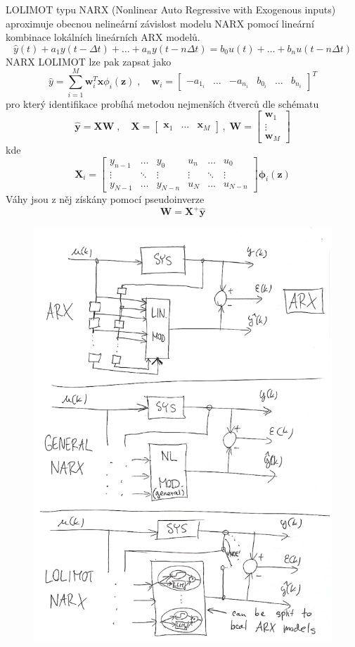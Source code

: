 \documentclass{article}
\begin{document}
	LOLIMOT typu NARX (Nonlinear Auto Regressive with Exogenous inputs) aproximuje obecnou nelineární závislost modelu NARX pomocí lineární kombinace lokálních lineárních ARX modelů.
	\begin{equation}
		\hat{y}(t) + a_1 y(t-\Delta t) + \dots + a_n y(t-n\Delta t)
		=
		b_0 u(t) + \dots + b_n u(t-n\Delta t)
	\end{equation}
	NARX LOLIMOT lze pak zapsat jako
	\begin{equation}
		\hat{y} = \sum_{i=1}^M \bm{w}_i^T \bm{x} \phi_i(\bm{z})
		\;,\quad 
		\bm{w}_i = \begin{bmatrix} -a_{1_i} & \dots & -a_{n_i} & b_{0_i} & \dots & b_{n_i} \end{bmatrix}^T
	\end{equation}
	pro který identifikace probíhá metodou nejmenších čtverců dle schématu
	\begin{equation}
		\bm{\hat{y}} = \bm{X}\bm{W}
		\;,\quad 
		\bm{X}
		=
		\begin{bmatrix}
			\bm{x}_1 & \dots & \bm{x}_M
		\end{bmatrix}
		\,,\;
		\bm{W}
		=
		\begin{bmatrix}
		\bm{w}_1 \\ \vdots \\ \bm{w}_M
		\end{bmatrix}
	\end{equation}
	kde
	\begin{equation}
		\bm{X}_i
		=
		\begin{bmatrix}
			y_{n-1} & \dots & y_0 & u_n & \dots & u_0 \\
			\vdots & \ddots & \vdots & \vdots & \ddots & \vdots \\
			y_{N-1} & \dots & y_{N-n} & u_N & \dots & u_{N-n}
		\end{bmatrix}
		\bm{\phi}_i(\bm{z})
	\end{equation}
	Váhy jsou z něj získány pomocí pseudoinverze
	\begin{equation}
	\bm{W} = \bm{X}^+ \bm{\hat{y}}
	\end{equation}

	\begin{figure}[h!]
		\centering
		\includegraphics[width=.5\linewidth]{figs/lolimot_narx.png}
	\end{figure}
\end{document}
